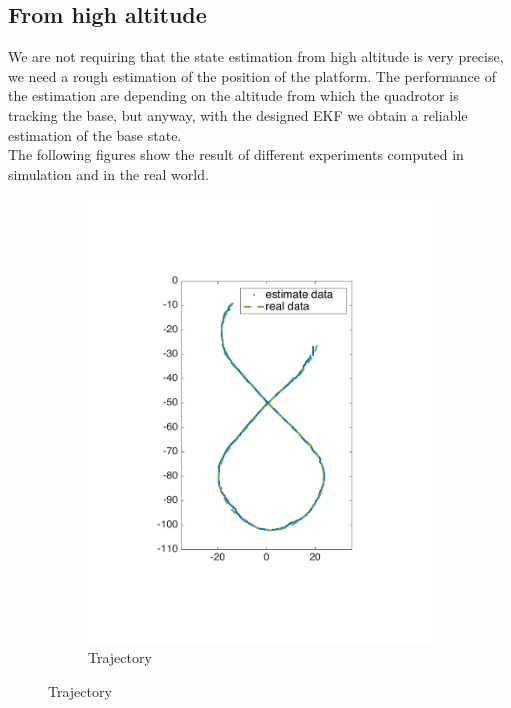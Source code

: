 \subsection{From high altitude}
We are not requiring that the state estimation from high altitude is very precise, we need a rough estimation of the position of the platform. The performance of the estimation are depending on the altitude from which the quadrotor is tracking the base, but anyway, with the designed  EKF we obtain a reliable estimation of the base state.\\
The following figures show the result of different experiments computed in simulation and in the real world.

\begin{figure}[!htbp]
  \centering
  \begin{subfigure}[b]{0.3\textwidth}
        \includegraphics[width=\textwidth]{img/high_altitude_error_xy.pdf}
        \caption{Trajectory}
        \label{fig:one}
   \end{subfigure} \hfill

\end{figure}

